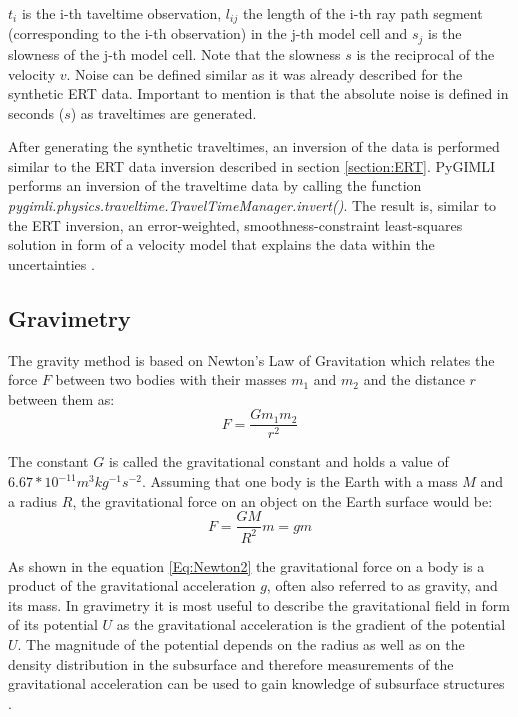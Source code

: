 $t_i$ is the i-th taveltime observation, $l_{ij}$ the length of the i-th ray path segment (corresponding to the i-th observation) in the j-th model cell and $s_j$ is the slowness of the j-th model cell. Note that the slowness $s$ is the reciprocal of the velocity $v$. Noise can be defined similar as it was already described for the synthetic ERT data. Important to mention is that the absolute noise is defined in seconds ($s$) as traveltimes are generated.

After generating the synthetic traveltimes, an inversion of the data is performed similar to the ERT data inversion described in section \ref{section:ERT}. PyGIMLI performs an inversion of the traveltime data by calling the function \textit{pygimli.physics.traveltime.TravelTimeManager.invert()}. The result is, similar to the ERT inversion, an error-weighted, smoothness-constraint least-squares solution in form of a velocity model that explains the data within the uncertainties \citep{Ruecker2017}.


\subsection{Gravimetry}\label{section:Gravimetry}
The gravity method is based on Newton's Law of Gravitation which relates the force $F$ between two bodies with their masses $m_1$ and $m_2$ and the distance $r$ between them as:
\begin{equation}
    F = \frac{Gm_1 m_2}{r^2}
    \label{Eq:Newton1}
\end{equation}

The constant $G$ is called the gravitational constant and holds a value of $6.67*10^{-11}m^{3}kg^{-1}s^{-2}$. Assuming that one body is the Earth with a mass $M$ and a radius $R$, the gravitational force on an object on the Earth surface would be:
\begin{equation}
    F = \frac{GM}{R^2}m = gm
    \label{Eq:Newton2}
\end{equation}

As shown in the equation \ref{Eq:Newton2} the gravitational force on a body is a product of the gravitational acceleration $g$, often also referred to as gravity, and its mass. In gravimetry it is most useful to describe the gravitational field in form of its potential $U$ as the gravitational acceleration is the gradient of the potential $U$. The magnitude of the potential depends on the radius as well as on the density distribution in the subsurface and therefore measurements of the gravitational acceleration can be used to gain knowledge of subsurface structures \citep{kearey2002introduction}.

